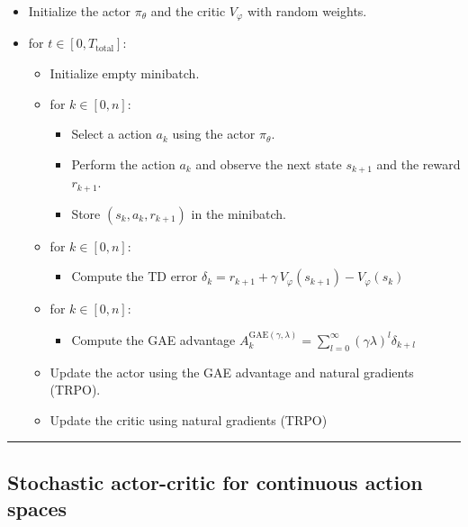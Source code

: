 \documentclass[
  letterpaper,
  DIV=11,
  numbers=noendperiod]{scrreprt}
\providecommand{\tightlist}{%
  \setlength{\itemsep}{0pt}\setlength{\parskip}{0pt}}\usepackage{longtable,booktabs,array}
\begin{document}
\begin{itemize}
\tightlist
\item
  Initialize the actor \(\pi_\theta\) and the critic \(V_\varphi\) with
  random weights.
\item
  for \(t \in [0, T_\text{total}]\):

  \begin{itemize}
  \item
    Initialize empty minibatch.
  \item
    for \(k \in [0, n]\):

    \begin{itemize}
    \tightlist
    \item
      Select a action \(a_k\) using the actor \(\pi_\theta\).
    \item
      Perform the action \(a_k\) and observe the next state \(s_{k+1}\)
      and the reward \(r_{k+1}\).
    \item
      Store \((s_k, a_k, r_{k+1})\) in the minibatch.
    \end{itemize}
  \item
    for \(k \in [0, n]\):

    \begin{itemize}
    \tightlist
    \item
      Compute the TD error
      \(\delta_k = r_{k+1} + \gamma \, V_\varphi(s_{k+1}) - V_\varphi(s_k)\)
    \end{itemize}
  \item
    for \(k \in [0, n]\):

    \begin{itemize}
    \tightlist
    \item
      Compute the GAE advantage
      \(A^{\text{GAE}(\gamma, \lambda)}_k = \sum_{l=0}^\infty (\gamma \lambda)^l \delta_{k+l}\)
    \end{itemize}
  \item
    Update the actor using the GAE advantage and natural gradients
    (TRPO).
  \item
    Update the critic using natural gradients (TRPO)
  \end{itemize}
\end{itemize}

\begin{center}\rule{0.5\linewidth}{0.5pt}\end{center}

\hypertarget{stochastic-actor-critic-for-continuous-action-spaces}{%
\subsection{Stochastic actor-critic for continuous action
spaces}\label{stochastic-actor-critic-for-continuous-action-spaces}}
\end{document}
